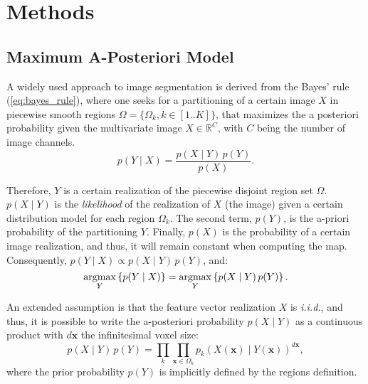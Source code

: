 \section{Methods}
\label{sec:methods}
%
\subsection{Maximum A-Posteriori Model}
\label{sec:methods_map}
%
A widely used approach to image segmentation is derived from the
Bayes' rule (\autoref{eq:bayes_rule}), where one seeks for a partitioning
of a certain image $X$ in piecewise smooth regions $\Omega = \lbrace \Omega_k , 
k\in\left[ 1 .. K \right] \rbrace$,  that maximizes the a posteriori 
probability given the multivariate image $X \in \mathbb{R}^C$, 
with $C$ being the number of image channels.
\begin{equation}
p(Y \mid X) = \frac{p(X \mid Y)\, p(Y)}{p(X)}.
\label{eq:bayes_rule}
\end{equation}

Therefore, $Y$ is a certain realization of the piecewise 
disjoint region set $\Omega$. $p(X \mid Y)$ is the \emph{likelihood} of 
the realization of $X$ (the image) given a certain distribution model for 
each region $\Omega_k$. The second term, $p(Y)$, is the a-priori probability of 
the partitioning $Y$. Finally, $p(X)$ is the probability of a certain image 
realization, and thus, it will remain constant when computing the \gls{map}.
Consequently, $p(Y \mid X) \propto p(X \mid Y)\, p(Y)$, and:
\begin{equation}
\underset{Y}{\operatorname{argmax}} \left\{ p(Y \mid X) \right\} = 
\underset{Y}{\operatorname{argmax}} \left\{ p(X \mid Y)\, p(Y) \right\}.
\end{equation}


An extended assumption is that the feature vector realization $X$ is
\emph{i.i.d.}, and thus, it is possible to write the a-posteriori
probability $p(X \mid Y)$ as a continuous product with $d\mathbf{x}$ the
infinitesimal voxel size:
\begin{equation}
p(X \mid Y) \, p(Y) = \underset{k}{\prod} \underset{\mathbf{x}\in \Omega_k}{\prod}
p_k( X(\mathbf{x}) \mid Y(\mathbf{x}) )^{d\mathbf{x}},
\label{eq:bayes_aposteriori}
\end{equation}
where the prior probability $p(Y)$ is implicitly
defined by the regions definition. 


